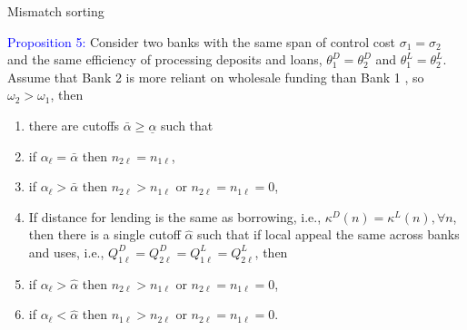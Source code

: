 \documentclass[notes,10pt, aspectratio=169]{beamer}
\newenvironment{wideitemize}{\itemize\addtolength{\itemsep}{10pt}}{\enditemize}
\begin{document}
    \begin{frame}{Mismatch sorting}

        \begin{wideitemize}
    
            \item \textcolor{blue}{Proposition 5:} Consider two banks with the same span of control cost $\sigma_1=\sigma_2$ and the same efficiency of processing deposits and loans, $\theta_1^D=\theta_2^D$ and $\theta_1^L=\theta_2^L$. Assume that Bank 2 is more reliant on wholesale funding than Bank 1 , so $\omega_2>\omega_1$, then
            
            \vspace{0.3cm}
            \begin{enumerate}
            \item there are cutoffs $\bar{\alpha} \geq \underline{\alpha}$ such that
          \vspace{0.3cm}
            \begin{wideitemize}
                \item if $\alpha_{\ell}=\bar{\alpha}$ then $n_{2 \ell}=n_{1 \ell}$,
                \item if $\alpha_{\ell}>\bar{\alpha}$ then $n_{2 \ell}>n_{1 \ell}$ or $n_{2 \ell}=n_{1 \ell}=0$,
            \end{wideitemize}

            \vspace{0.3cm}
            \item If distance for lending is the same as borrowing, i.e., $\kappa^D(n)=\kappa^L(n), \forall n$, then there is a single cutoff $\hat{\alpha}$ such that if local appeal the same across banks and uses, i.e., $Q_{1 \ell}^D=Q_{2 \ell}^D=Q_{1 \ell}^L=Q_{2 \ell}^L$, then
            \vspace{0.3cm}
            \begin{wideitemize}
                \item if $\alpha_{\ell}>\hat{\alpha}$ then $n_{2 \ell}>n_{1 \ell}$ or $n_{2 \ell}=n_{1 \ell}=0$,
                \item if $\alpha_{\ell}<\hat{\alpha}$ then $n_{1 \ell}>n_{2 \ell}$ or $n_{2 \ell}=n_{1 \ell}=0$.
            \end{wideitemize}
        

\end{enumerate}
\end{wideitemize}
\end{frame}
\end{document}
